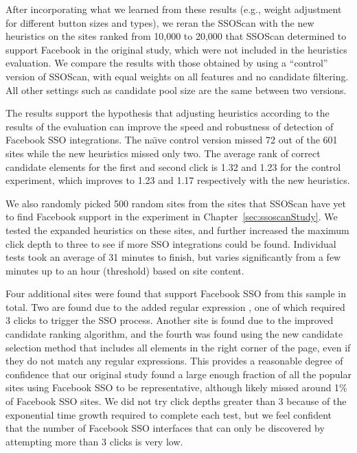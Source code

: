 After incorporating what we learned from these results (e.g., weight adjustment for different button sizes and types), we reran the SSOScan with the new heuristics on the sites ranked from 10,000 to 20,000 that SSOScan determined to support Facebook in the original study, which were not included in the heuristics evaluation.  We compare the results with those obtained by using a ``control'' version of SSOScan, with equal weights on all features and no candidate filtering.  All other settings such as candidate pool size are the same between two versions.

The results support the hypothesis that adjusting heu\-ri\-stics according to the results of the evaluation can improve the speed and robustness of detection of Facebook SSO integrations.  The na\"{\i}ve control version missed 72 out of the 601 sites while the new heuristics missed only two.  The average rank of correct candidate elements for the first and second click is 1.32 and 1.23 for the control experiment, which improves to 1.23 and 1.17 respectively with the new heuristics.

We also randomly picked 500 random sites from the sites that SSOScan have yet to find Facebook support in the experiment in Chapter~\ref{sec:ssoscanStudy}.  We tested the expanded heuristics on these sites, and further increased the maximum click depth to three to see if more SSO integrations could be found.  Individual tests took an average of 31 minutes to finish, but varies significantly from a few minutes up to an hour (threshold) based on site content.

Four additional sites were found that support Facebook SSO from this sample in total.  Two are found due to the added regular expression \code{[Ff][Oo][Rr][Uu][Mm]}, one of which required 3 clicks to trigger the SSO process.  Another site is found due to the improved candidate ranking algorithm, and the fourth was found using the new candidate selection method that includes all elements in the right corner of the page, even if they do not match any regular expressions.  This provides a reasonable degree of confidence that our original study found a large enough fraction of all the popular sites using Facebook SSO to be representative, although likely missed around 1\% of Facebook SSO sites.  We did not try click depths greater than 3 because of the exponential time growth required to complete each test, but we feel confident that the number of Facebook SSO interfaces that can only be discovered by attempting more than 3 clicks is very low.

